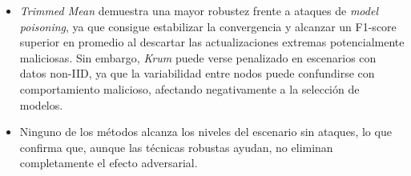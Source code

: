 \begin{itemize}
    \item \textit{Trimmed Mean} demuestra una mayor robustez frente a ataques de \textit{model poisoning}, ya que consigue estabilizar la convergencia y alcanzar un F1-score superior en promedio al descartar las actualizaciones extremas potencialmente maliciosas. Sin embargo, \textit{Krum} puede verse penalizado en escenarios con datos non-IID, ya que la variabilidad entre nodos puede confundirse con comportamiento malicioso, afectando negativamente a la selección de modelos.
    \item  Ninguno de los métodos alcanza los niveles del escenario sin ataques, lo que confirma que, aunque las técnicas robustas ayudan, no eliminan completamente el efecto adversarial.
\end{itemize}

